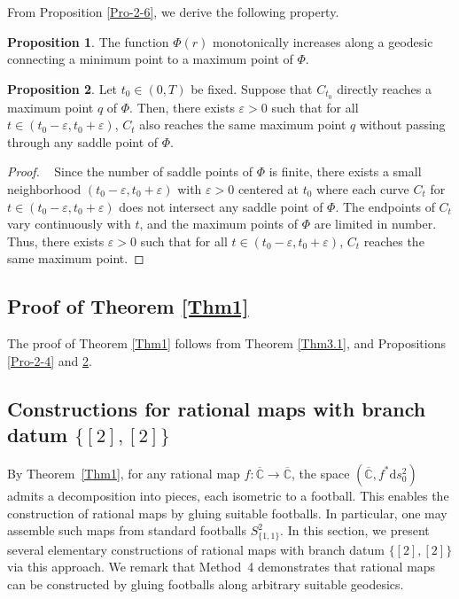 \documentclass[microtype]{gtpart}     %
\theoremstyle{definition}
\newtheorem{prop}{Proposition}[section]
\begin{document}
From Proposition  \ref{Pro-2-6}, we derive the following property.


\begin{prop}
The function $\Phi(r)$ monotonically increases along a geodesic connecting a minimum point to a maximum point of $\Phi$.
\end{prop}

\begin{prop}\label{Pro-2-7}
 Let $t_{0}\in (0,T)$ be fixed. Suppose that $C_{t_{0}}$ directly reaches a maximum point $q$ of $\Phi$. Then, there exists $\varepsilon>0$ such that for all $t\in(t_{0}-\varepsilon,t_{0}+\varepsilon)$, $C_{t}$ also reaches the same maximum point $q$ without passing through any saddle point of $\Phi$.
\end{prop}
\begin{proof}~
Since the number of saddle points of $\Phi$ is finite, there exists a small neighborhood $(t_{0}-\varepsilon, t_{0}+\varepsilon)$ with $\varepsilon>0$ centered at $t_{0}$ where each curve $C_{t}$ for $t\in(t_{0}-\varepsilon, t_{0}+\varepsilon)$ does not intersect any saddle point of $\Phi$. The endpoints of $C_{t}$ vary continuously with $t$, and the maximum points of $\Phi$ are limited in number. Thus, there exists $\varepsilon>0$ such that for all $t\in(t_{0}-\varepsilon, t_{0}+\varepsilon)$, $C_{t}$ reaches the same maximum point.
\end{proof}


\subsection{Proof of Theorem \ref{Thm1}}
The proof of Theorem \ref{Thm1} follows from Theorem \ref{Thm3.1},  and Propositions \ref{Pro-2-4} and \ref{Pro-2-7}.

\subsection{Constructions for rational maps with branch datum $\{[2],[2]\}$}
By Theorem~\ref{Thm1}, for any rational map $f : \overline{\mathbb{C}} \to \overline{\mathbb{C}}$, the space $(\overline{\mathbb{C}}, f^*\mathrm{d}s^2_0)$ admits a decomposition into pieces, each isometric to a football. This enables the construction of rational maps by gluing suitable footballs. In particular, one may assemble such maps from standard footballs $S^2_{\{1,1\}}$. In this section, we present several elementary constructions of rational maps with branch datum $\{[2],[2]\}$ via this approach. We remark that Method~4 demonstrates that rational maps can be constructed by gluing footballs along arbitrary suitable geodesics.
\end{document}
